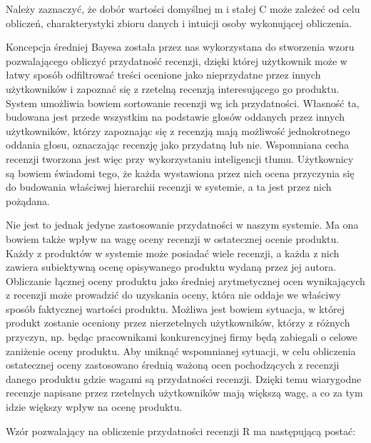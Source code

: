 Należy zaznaczyć, że dobór wartości domyślnej m i stałej C może zależeć od celu obliczeń, charakterystyki zbioru danych i intuicji osoby wykonującej obliczenia.

Koncepcja średniej Bayesa została przez nas wykorzystana do stworzenia wzoru pozwalającego obliczyć przydatność recenzji, dzięki której użytkownik może w łatwy sposób odfiltrować treści ocenione jako nieprzydatne przez innych użytkowników i zapoznać się z rzetelną recenzją interesującego go produktu. System umożliwia bowiem sortowanie recenzji wg ich przydatności. Własność ta, budowana jest przede wszystkim na podstawie głosów oddanych przez innych użytkowników, którzy zapoznając się z recenzją mają możliwość jednokrotnego oddania głosu, oznaczając recenzję jako przydatną lub nie. Wspomniana cecha recenzji tworzona jest więc przy wykorzystaniu inteligencji tłumu. Użytkownicy są bowiem świadomi tego, że każda wystawiona przez nich ocena przyczynia się do budowania właściwej hierarchii recenzji w systemie, a ta jest przez nich pożądana.

Nie jest to jednak jedyne zastosowanie przydatności w naszym systemie. Ma ona bowiem także wpływ na wagę oceny recenzji w ostatecznej ocenie produktu. Każdy z produktów w systemie może posiadać wiele recenzji, a każda z nich zawiera subiektywną ocenę opisywanego produktu wydaną przez jej autora. Obliczanie łącznej oceny produktu jako średniej arytmetycznej ocen wynikających z recenzji może prowadzić do uzyskania oceny, która nie oddaje we właściwy sposób faktycznej wartości produktu. Możliwa jest bowiem sytuacja, w której produkt zostanie oceniony przez nierzetelnych użytkowników, którzy z różnych przyczyn, np. będąc pracownikami konkurencyjnej firmy będą zabiegali o celowe zaniżenie oceny produktu. Aby uniknąć wspomnianej sytuacji, w celu obliczenia ostatecznej oceny zastosowano średnią ważoną ocen pochodzących z recenzji danego produktu gdzie wagami są przydatności recenzji. Dzięki temu wiarygodne  recenzje napisane przez rzetelnych użytkowników mają większą wagę, a co za tym idzie większy wpływ na ocenę produktu.

Wzór pozwalający na obliczenie przydatności recenzji R ma następującą postać:

